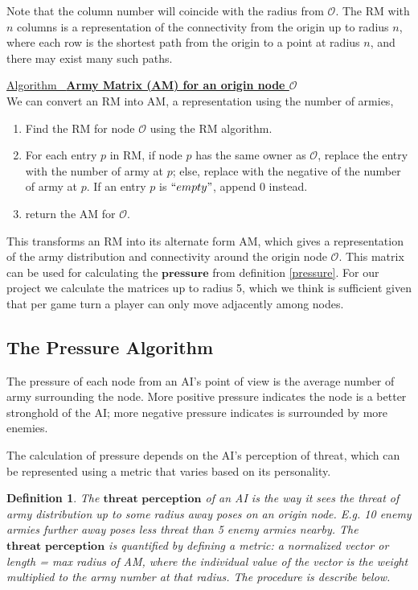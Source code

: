\documentclass[12pt]{article}  %
\newtheorem{definition}{Definition}
\newcommand{\algtitle}[1]{\underline{Algorithm \ {\bf #1}} \vspace*{1mm}\\}
\begin{document}
Note that the column number will coincide with the radius from $\mathcal{O}$. The RM with $n$ columns is a representation of the connectivity from the origin up to radius $n$, where each row is the shortest path from the origin to a point at radius $n$, and there may exist many such paths.

\algtitle{Army Matrix (AM) for an origin node $\mathcal{O}$}
We can convert an RM into AM, a representation using the number of armies,
\begin{enumerate}
	\item Find the RM for node $\mathcal{O}$ using the RM algorithm.
	\item For each entry $p$ in RM, if node $p$ has the same owner as $\mathcal{O}$, replace the entry with the number of army at $p$; else, replace with the negative of the number of army at $p$. If an entry $p$ is $``empty"$, append 0 instead.
	\item return the AM for $\mathcal{O}$.
\end{enumerate}


This transforms an RM into its alternate form AM, which gives a representation of the army distribution and connectivity around the origin node $\mathcal{O}$. This matrix can be used for calculating the $\textbf{pressure}$ from definition \ref{pressure}. For our project we calculate the matrices up to radius 5, which we think is sufficient given that per game turn a player can only move adjacently among nodes.





\subsection{The Pressure Algorithm}

The pressure of each node from an AI's point of view is the average number of army surrounding the node. More positive pressure indicates the node is a better stronghold of the AI; more negative pressure indicates is surrounded by more enemies.

The calculation of pressure depends on the AI's perception of threat, which can be represented using a metric that varies based on its personality.

\begin{definition}
The $\textbf{threat perception}$ of an AI is the way it sees the threat of army distribution up to some radius away poses on an origin node. E.g. 10 enemy armies further away poses less threat than 5 enemy armies nearby. The $\textbf{threat perception}$ is quantified by defining a metric: a normalized vector or length = max radius of AM, where the individual value of the vector is the weight multiplied to the army number at that radius. The procedure is describe below.
\end{definition}
\end{document}
